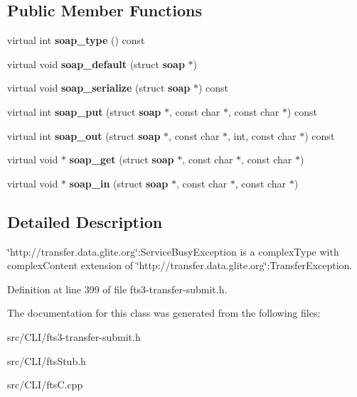 \subsection*{Public Member Functions}
\begin{DoxyCompactItemize}
\item 
virtual int {\bfseries soap\_\-type} () const \label{classtransfer____ServiceBusyException_ae66e53c6957d99516f54aa07f2304931}

\item 
virtual void {\bfseries soap\_\-default} (struct {\bf soap} $\ast$)\label{classtransfer____ServiceBusyException_a9f4ec5a0c05980001e6e2a7672056702}

\item 
virtual void {\bfseries soap\_\-serialize} (struct {\bf soap} $\ast$) const \label{classtransfer____ServiceBusyException_a2063b88ee61cf03513920ea37784bb27}

\item 
virtual int {\bfseries soap\_\-put} (struct {\bf soap} $\ast$, const char $\ast$, const char $\ast$) const \label{classtransfer____ServiceBusyException_a4f006f3ca3ace06b6a1b03ad14d5d2c3}

\item 
virtual int {\bfseries soap\_\-out} (struct {\bf soap} $\ast$, const char $\ast$, int, const char $\ast$) const \label{classtransfer____ServiceBusyException_aad3fd5a728829e0ca90e1b331cb0e2fa}

\item 
virtual void $\ast$ {\bfseries soap\_\-get} (struct {\bf soap} $\ast$, const char $\ast$, const char $\ast$)\label{classtransfer____ServiceBusyException_a5bbc44b85968a28d98120c23ee95e4d9}

\item 
virtual void $\ast$ {\bfseries soap\_\-in} (struct {\bf soap} $\ast$, const char $\ast$, const char $\ast$)\label{classtransfer____ServiceBusyException_afae8d05d864e9c4f01a30b7c45f9065e}

\end{DoxyCompactItemize}


\subsection{Detailed Description}
\char`\"{}http://transfer.data.glite.org\char`\"{}:ServiceBusyException is a complexType with complexContent extension of \char`\"{}http://transfer.data.glite.org\char`\"{}:TransferException. 

Definition at line 399 of file fts3-\/transfer-\/submit.h.



The documentation for this class was generated from the following files:\begin{DoxyCompactItemize}
\item 
src/CLI/fts3-\/transfer-\/submit.h\item 
src/CLI/ftsStub.h\item 
src/CLI/ftsC.cpp\end{DoxyCompactItemize}
